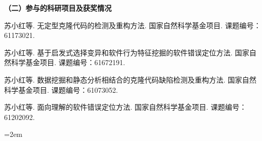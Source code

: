 

%




\noindent\textbf{（二）参与的科研项目及获奖情况}
\begin{publist}
\item	
苏小红等. 无定型克隆代码的检测及重构方法. 国家自然科学基金项目. 课题编号：61173021.
\item 
苏小红等. 基于启发式选择变异和软件行为特征挖掘的软件错误定位方法. 国家自然科学基金项目. 课题编号：61672191.
\item
苏小红等. 数据挖掘和静态分析相结合的克隆代码缺陷检测及重构方法. 国家自然科学基金项目. 课题编号：61073052.
\item
苏小红等. 面向理解的软件错误定位方法. 国家自然科学基金项目. 课题编号：61202092.

\end{publist}
\vfill
{}\hangindent=2em\noindent

\setlength{\parindent}{2em}
